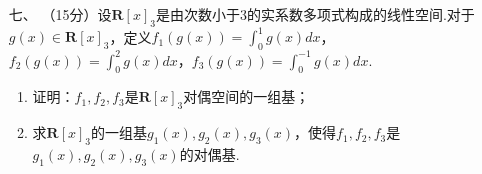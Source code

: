 \begin{enumerate}
	\item[七、]（15分）设$\mathbf{R}[x]_3$是由次数小于3的实系数多项式构成的线性空间.对于$g(x)\in\mathbf{R}[x]_3$，定义$f_1(g(x))=\int_0^1g(x)dx$，$f_2(g(x))=\int_0^2g(x)dx$，$f_3(g(x))=\int_0^{-1}g(x)dx$.
    \begin{enumerate}[label=(\arabic*)]
        \item 证明：$f_1,f_2,f_3$是$\mathbf{R}[x]_3$对偶空间的一组基；
        \item 求$\mathbf{R}[x]_3$的一组基$g_1(x),g_2(x),g_3(x)$，使得$f_1,f_2,f_3$是$g_1(x),g_2(x),g_3(x)$的对偶基.
    \end{enumerate}
\end{enumerate}

\clearpage
